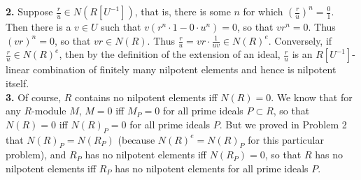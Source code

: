\documentclass[11pt]{article}
\newcommand{\num}[1]{\noindent \textbf{#1}}
\theoremstyle{definition}
\begin{document}


\num{2.} Suppose $\frac{r}{u}\in N(R[U^{-1}])$, that is, there is some $n$ for which $\left(\frac{r}{u}\right)^n=\frac{0}{1}$. Then there is a $v\in U$ such that $v(r^n\cdot1-0\cdot u^n)=0$, so that $vr^n=0$. Thus $(vr)^n=0$, so that $vr\in N(R)$. Thus $\frac{r}{u}=vr\cdot\frac{1}{uv}\in N(R)^e$. Conversely, if $\frac{r}{u}\in N(R)^e$, then by the definition of the extension of an ideal, $\frac{r}{u}$ is an $R[U^{-1}]$-linear combination of finitely many nilpotent elements and hence is nilpotent itself.     \\

\num{3.} Of course, $R$ contains no nilpotent elements iff $N(R)=0$. We know that for any $R$-module $M$, $M=0$ iff $M_P=0$ for all prime ideals $P\subset R$, so that $N(R)=0$ iff $N(R)_P=0$ for all prime ideals $P$. But we proved in Problem 2 that $N(R)_P=N(R_P)$ (because $N(R)^e=N(R)_P$ for this particular problem), and $R_P$ has no nilpotent elements iff $N(R_P)=0$, so that $R$ has no nilpotent elements iff $R_P$ has no nilpotent elements for all prime ideals $P$.     \\
\end{document}
